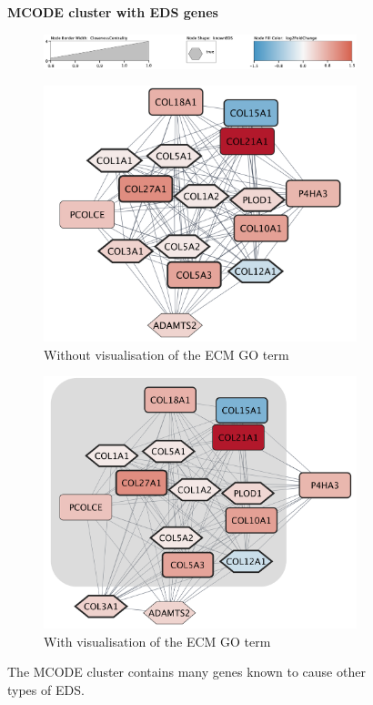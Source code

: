 \begin{figure}[htb!]
	\centering
	\caption*{\textbf{MCODE cluster with EDS genes}}
	 \begin{subfigure}{0.8\textwidth}
 		\centering
 		\includegraphics[width=\textwidth]{fig/mcode-legend.png}
 		\vspace{0.2cm}
 	\end{subfigure}
	\begin{subfigure}{.49\textwidth}
		\centering
 		\includegraphics[width=\textwidth]{fig/mcode-cluster-without-enrichment.png}
 			\caption{Without visualisation of the ECM GO term}
 	\end{subfigure}
 	\begin{subfigure}{.49\textwidth}
 		\centering
 		\includegraphics[width=\textwidth]{fig/mcode-cluster-eds-genes-with-ecm.png}
 		\caption{With visualisation of the ECM GO term}
 	\end{subfigure}
	\caption[MCODE cluster with EDS genes]{\centering The MCODE cluster contains many genes known to cause other types of EDS.}
	\label{fig:mcode3}
\end{figure}


